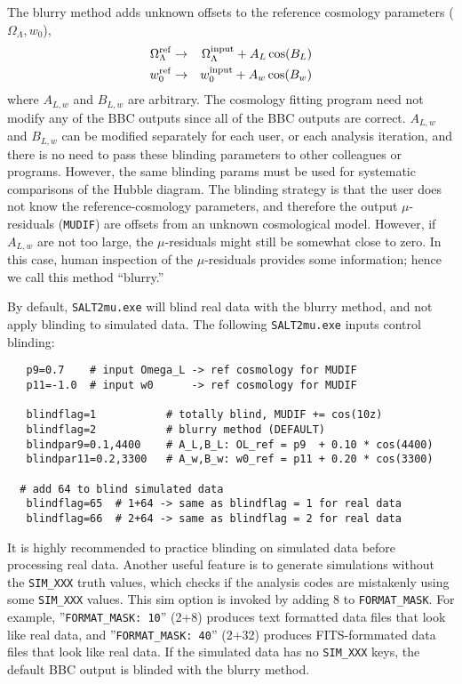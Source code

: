 \documentclass[12pt]{article}
\newcommand{\OL}{\Omega_{\Lambda}}
\begin{document}
The blurry method adds unknown offsets to the reference
cosmology parameters ($\OL,w_0$),
%
\begin{eqnarray}
   \OL^{\rm ref}  & \to & \OL^{\rm input} +  A_L\cos(B_L) \\
    w_0^{\rm ref} & \to & w_0^{\rm input} +  A_w\cos(B_w)
\end{eqnarray}
%
where $A_{L,w}$ and $B_{L,w}$ are arbitrary.
The cosmology fitting program need not modify any of the 
BBC outputs since all of the BBC outputs are correct.
$A_{L,w}$ and $B_{L,w}$ can be modified separately for each user, 
or each analysis iteration, 
and there is no need to pass these blinding parameters to other 
colleagues or programs. However, the same blinding params must
be used for systematic comparisons of the Hubble diagram.
The blinding strategy is that the user does not know 
the reference-cosmology parameters, and therefore
the output $\mu$-residuals ({\tt MUDIF}) are offsets from
an unknown cosmological model.
However, if $A_{L,w}$ are not too large, the $\mu$-residuals 
might still be somewhat close to zero. In this case, human inspection
of the $\mu$-residuals provides some information; 
hence we call this method ``blurry.''

By default, {\tt SALT2mu.exe} will blind real data with the blurry
method, and not apply blinding to simulated data.
The following {\tt SALT2mu.exe} inputs control blinding:
\begin{verbatim}
   p9=0.7    # input Omega_L -> ref cosmology for MUDIF
   p11=-1.0  # input w0      -> ref cosmology for MUDIF

   blindflag=1           # totally blind, MUDIF += cos(10z)
   blindflag=2           # blurry method (DEFAULT)
   blindpar9=0.1,4400    # A_L,B_L: OL_ref = p9  + 0.10 * cos(4400)
   blindpar11=0.2,3300   # A_w,B_w: w0_ref = p11 + 0.20 * cos(3300)
  
  # add 64 to blind simulated data
   blindflag=65  # 1+64 -> same as blindflag = 1 for real data
   blindflag=66  # 2+64 -> same as blindflag = 2 for real data
\end{verbatim}
%
It is highly recommended to practice blinding on simulated
data before processing real data. Another useful feature
is to generate simulations without the {\tt SIM\_XXX}
truth values, which checks if the analysis codes are mistakenly
using some {\tt SIM\_XXX} values.
This sim option is invoked by adding 8 to {\tt FORMAT\_MASK}. 
For example, ''{\tt FORMAT\_MASK: 10}'' (2+8) produces text formatted
data files that look like real data,
and ''{\tt FORMAT\_MASK: 40}'' (2+32) produces FITS-formmated
data files that look like real data. If the simulated data has no
{\tt SIM\_XXX} keys, the default BBC output is blinded
with the blurry method.
\end{document}
